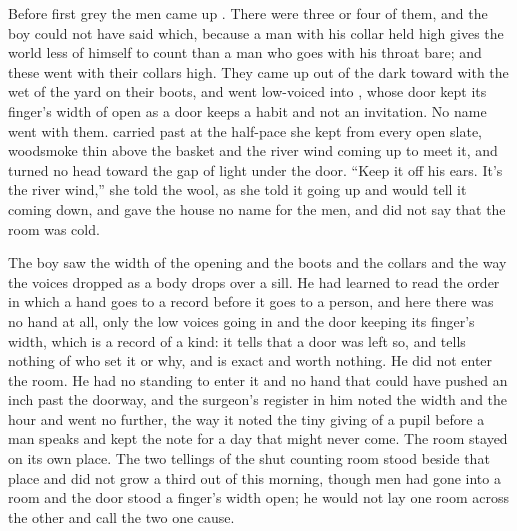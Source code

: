 
Before first grey the men came up . There were three or four of them, and the boy could not have said which, because a man with his collar held high gives the world less of himself to count than a man who goes with his throat bare; and these went with their collars high. They came up out of the dark toward  with the wet of the yard on their boots, and went low-voiced into , whose door kept its finger's width of open as a door keeps a habit and not an invitation. No name went with them.  carried  past at the half-pace she kept from every open slate, woodsmoke thin above the basket and the river wind coming up to meet it, and turned no head toward the gap of light under the door. “Keep it off his ears. It's the river wind,” she told the wool, as she told it going up and would tell it coming down, and gave the house no name for the men, and did not say that the room was cold.

The boy saw the width of the opening and the boots and the collars and the way the voices dropped as a body drops over a sill. He had learned to read the order in which a hand goes to a record before it goes to a person, and here there was no hand at all, only the low voices going in and the door keeping its finger's width, which is a record of a kind: it tells that a door was left so, and tells nothing of who set it or why, and is exact and worth nothing. He did not enter the room. He had no standing to enter it and no hand that could have pushed an inch past the doorway, and the surgeon's register in him noted the width and the hour and went no further, the way it noted the tiny giving of a pupil before a man speaks and kept the note for a day that might never come. The room stayed on its own place. The two tellings of the shut counting room stood beside that place and did not grow a third out of this morning, though men had gone into a room and the door stood a finger's width open; he would not lay one room across the other and call the two one cause.

